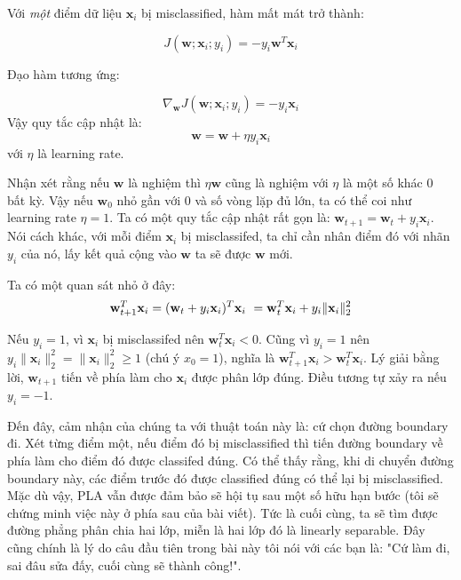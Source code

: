 Với \textit{một} điểm dữ liệu $\mathbf{x}_i$ bị misclassified, hàm mất mát trở thành: 
 
\begin{equation} 
    J(\mathbf{w}; \mathbf{x}_i; y_i) = -y_i\mathbf{w}^T\mathbf{x}_i 
\end{equation} 
 
Đạo hàm tương ứng: 
 
\begin{equation} 
    \nabla_{\mathbf{w}}J(\mathbf{w}; \mathbf{x}_i; y_i) = -y_i\mathbf{x}_i 
\end{equation} 
Vậy quy tắc cập nhật là: 
\begin{equation} 
\mathbf{w} = \mathbf{w} + \eta y_i\mathbf{x}_i 
\end{equation} 
với $\eta$ là learning rate.  
 
Nhận xét rằng nếu $\mathbf{w}$ là nghiệm thì $\eta\mathbf{w}$ cũng là nghiệm với $\eta$ là một số khác 0 bất kỳ. Vậy nếu $\mathbf{w}_0$ nhỏ gần với 0 và số vòng lặp đủ lớn, ta có thể coi như learning rate $\eta = 1$. Ta có một quy tắc cập nhật rất gọn là: $\mathbf{w}_{t+1} = \mathbf{w}_{t} + y_i\mathbf{x}_i$. Nói cách khác, với mỗi điểm $\mathbf{x}_i$ bị misclassifed, ta chỉ cần nhân điểm đó với nhãn $y_i$ của nó, lấy kết quả cộng vào $\mathbf{w}$ ta sẽ được $\mathbf{w}$ mới. 
 
Ta có một quan sát nhỏ ở đây: 
\begin{equation} 
\mathbf{w}_{t+1}^T\mathbf{x}_i = (\mathbf{w}_{t} + y_i\mathbf{x}_i)^T\mathbf{x}_{i} \\\ 
= \mathbf{w}_{t}^T\mathbf{x}_i + y_i \|\mathbf{x}_i\|_2^2 
\end{equation} 
 
Nếu $y_i = 1$, vì $\mathbf{x}_i$ bị misclassifed nên $\mathbf{w}_{t}^T\mathbf{x}_i < 0$. Cũng vì $y_i = 1$ nên $y_i \|\mathbf{x}_i\|_2^2 = \|\mathbf{x}_i\|_2^2 \geq 1$ (chú ý $x_0 = 1$), nghĩa là $\mathbf{w}_{t+1}^T\mathbf{x}_i > \mathbf{w}_{t}^T\mathbf{x}_i$. Lý giải bằng lời, $\mathbf{w}_{t+1}$ tiến về phía làm cho $\mathbf{x}_i$ được phân lớp đúng. Điều tương tự xảy ra nếu $y_i = -1$. 
 
Đến đây, cảm nhận của chúng ta với thuật toán này là: cứ chọn đường boundary đi. Xét từng điểm một, nếu điểm đó bị misclassified thì tiến đường boundary về phía làm cho điểm đó được classifed đúng. Có thể thấy rằng, khi di chuyển đường boundary này, các điểm trước đó được classified đúng có thể lại bị misclassified. Mặc dù vậy, PLA vẫn được đảm bảo sẽ hội tụ sau một số hữu hạn bước (tôi sẽ chứng minh việc này ở phía sau của bài viết). Tức là cuối cùng, ta sẽ tìm được đường phẳng phân chia hai lớp, miễn là hai lớp đó là linearly separable. Đây cũng chính là lý do câu đầu tiên trong bài này tôi nói với các bạn là: "Cứ làm đi, sai đâu sửa đấy, cuối cùng sẽ thành công!". 
 
